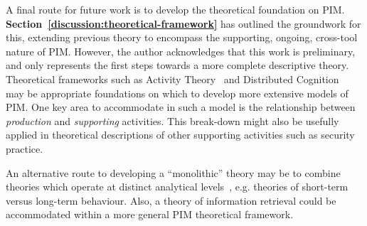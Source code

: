 A final route for future work is to develop the theoretical foundation on PIM.  \textbf{Section~\ref{discussion:theoretical-framework}} has outlined the groundwork for this, extending previous theory to encompass the supporting, ongoing, cross-tool nature of PIM.  However, the author acknowledges that this work is preliminary, and only represents the first steps towards a more complete descriptive theory.
Theoretical frameworks such as Activity Theory~\citep{bn-at:95} and Distributed Cognition~\citep{dk:01} may be appropriate foundations on which to develop more extensive models of PIM.  One key area to accommodate in such a model is the relationship between \textit{production} and \textit{supporting} activities.  This break-down might also be usefully applied in theoretical descriptions of other supporting activities such as security practice.

An alternative route to developing a ``monolithic'' theory may be to combine theories which operate at distinct analytical levels~\citep{barnard:00}, e.g. theories of short-term versus long-term behaviour.  Also, a theory of information retrieval could be accommodated within a more general PIM theoretical framework.  %

